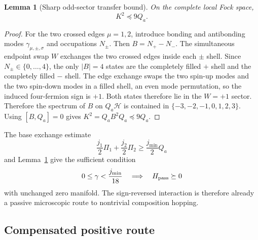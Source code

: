 \documentclass[11pt]{article}
\newtheorem{lemma}[theorem]{Lemma}
\theoremstyle{definition}
\theoremstyle{remark}
\newcommand{\cH}{\mathcal H}
\newcommand{\abs}[1]{\lvert #1\rvert}
\begin{document}
\begin{lemma}[Sharp odd-sector transfer bound]
\label{lem:sharp-bound}
On the complete local Fock space,
\begin{equation}
 \boxed{K^2\preceq9Q_a.}
 \label{eq:sharp-bound}
\end{equation}
\end{lemma}

\begin{proof}
For the two crossed edges $\mu=1,2$, introduce bonding and antibonding modes $\gamma_{\mu,\pm,\sigma}$ and occupations $N_\pm$.  Then $B=N_+-N_-$.  The simultaneous endpoint swap $W$ exchanges the two crossed edges inside each $\pm$ shell.  Since $N_\pm\in\{0,\ldots,4\}$, the only $\abs B=4$ states are the completely filled $+$ shell and the completely filled $-$ shell.  The edge exchange swaps the two spin-up modes and the two spin-down modes in a filled shell, an even mode permutation, so the induced four-fermion sign is $+1$.  Both states therefore lie in the $W=+1$ sector.  Therefore the spectrum of $B$ on $Q_a\cH$ is contained in $\{-3,-2,-1,0,1,2,3\}$.  Using $[B,Q_a]=0$ gives $K^2=Q_aB^2Q_a\preceq9Q_a$.
\end{proof}

The base exchange estimate
\begin{equation}
 \frac{j_1}{2}\Pi_1+\frac{j_2}{2}\Pi_2\ge\frac{j_{\min}}2Q_a
\end{equation}
and Lemma~\ref{lem:sharp-bound} give the sufficient condition
\begin{equation}
 0\le\gamma<\frac{j_{\min}}{18}
 \quad\Longrightarrow\quad H_{\rm pass}\succeq0
 \label{eq:passive-bound}
\end{equation}
with unchanged zero manifold.  The sign-reversed interaction is therefore already a passive microscopic route to nontrivial composition hopping.

\subsection{Compensated positive route}
\end{document}
